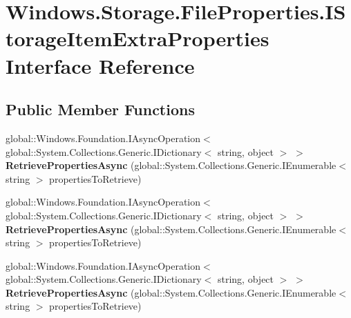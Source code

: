 \hypertarget{interface_windows_1_1_storage_1_1_file_properties_1_1_i_storage_item_extra_properties}{}\section{Windows.\+Storage.\+File\+Properties.\+I\+Storage\+Item\+Extra\+Properties Interface Reference}
\label{interface_windows_1_1_storage_1_1_file_properties_1_1_i_storage_item_extra_properties}
\subsection*{Public Member Functions}
\begin{DoxyCompactItemize}
\item 
\mbox{\label{interface_windows_1_1_storage_1_1_file_properties_1_1_i_storage_item_extra_properties_a7dfadacf0d528644213ab42e8a7defbe}} 
global\+::\+Windows.\+Foundation.\+I\+Async\+Operation$<$ global\+::\+System.\+Collections.\+Generic.\+I\+Dictionary$<$ string, object $>$ $>$ {\bfseries Retrieve\+Properties\+Async} (global\+::\+System.\+Collections.\+Generic.\+I\+Enumerable$<$ string $>$ properties\+To\+Retrieve)
\item 
\mbox{\label{interface_windows_1_1_storage_1_1_file_properties_1_1_i_storage_item_extra_properties_a7dfadacf0d528644213ab42e8a7defbe}} 
global\+::\+Windows.\+Foundation.\+I\+Async\+Operation$<$ global\+::\+System.\+Collections.\+Generic.\+I\+Dictionary$<$ string, object $>$ $>$ {\bfseries Retrieve\+Properties\+Async} (global\+::\+System.\+Collections.\+Generic.\+I\+Enumerable$<$ string $>$ properties\+To\+Retrieve)
\item 
\mbox{\label{interface_windows_1_1_storage_1_1_file_properties_1_1_i_storage_item_extra_properties_a7dfadacf0d528644213ab42e8a7defbe}} 
global\+::\+Windows.\+Foundation.\+I\+Async\+Operation$<$ global\+::\+System.\+Collections.\+Generic.\+I\+Dictionary$<$ string, object $>$ $>$ {\bfseries Retrieve\+Properties\+Async} (global\+::\+System.\+Collections.\+Generic.\+I\+Enumerable$<$ string $>$ properties\+To\+Retrieve)

\end{DoxyCompactItemize}

